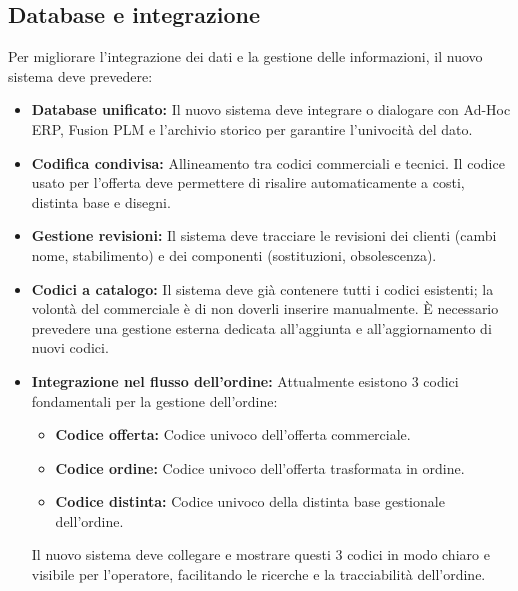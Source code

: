 \subsection{Database e integrazione}
Per migliorare l'integrazione dei dati e la gestione delle informazioni, il nuovo sistema deve prevedere:
\begin{itemize}
      \item \textbf{Database unificato:} Il nuovo sistema deve integrare o dialogare con Ad-Hoc \ac{ERP}, Fusion \ac{PLM}
            e l'archivio storico per garantire l'univocità del dato.
      \item \textbf{Codifica condivisa:} Allineamento tra codici commerciali e tecnici.
            Il codice usato per l'offerta deve permettere di risalire automaticamente a costi, distinta base e disegni.
      \item \textbf{Gestione revisioni:} Il sistema deve tracciare le revisioni dei clienti
            (cambi nome, stabilimento) e dei componenti (sostituzioni, obsolescenza).
      \item \textbf{Codici a catalogo:} Il sistema deve già contenere tutti i codici esistenti;
            la volontà del commerciale è di non doverli inserire manualmente. È necessario prevedere una
            gestione esterna dedicata all'aggiunta e all'aggiornamento di nuovi codici.
      \item \textbf{Integrazione nel flusso dell'ordine:} Attualmente esistono 3 codici fondamentali per
            la gestione dell'ordine:
            \begin{itemize}
                  \item \textbf{Codice offerta:} Codice univoco dell'offerta commerciale.
                  \item \textbf{Codice ordine:} Codice univoco dell'offerta trasformata in ordine.
                  \item \textbf{Codice distinta:} Codice univoco della distinta base gestionale dell'ordine.
            \end{itemize}
            Il nuovo sistema deve collegare e mostrare questi 3 codici in modo chiaro e visibile per l'operatore,
            facilitando le ricerche e la tracciabilità dell'ordine.
\end{itemize}


